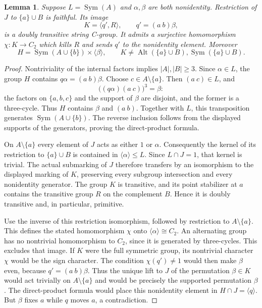 \documentclass[11pt,a4paper]{article}
\newtheorem{lemma}[theorem]{Lemma}
\newcommand{\gen}[1]{\langle#1\rangle}
\newcommand{\Sym}{\operatorname{Sym}}
\newcommand{\Alt}{\operatorname{Alt}}
\begin{document}
\begin{lemma}\label{faithful}
Suppose $L=\Sym(A)$ and $\alpha,\beta$ are both nonidentity.
Restriction of $J$ to $\{a\}\cup B$ is faithful. Its image
\[
 K=\gen{q',R},\qquad q'=(a\ b)\beta,
\]
is a doubly transitive string C-group. It admits a surjective
homomorphism $\chi:K\longrightarrow C_2$ which kills $R$ and
sends $q'$ to the nonidentity element. Moreover
\[
 H=\Sym(A\cup\{b\})\times\gen\beta,
 \qquad K\ne\Alt(\{a\}\cup B),\Sym(\{a\}\cup B).
\]
\end{lemma}
\begin{proof}
Nontriviality of the internal factors implies $|A|,|B|\ge3$.
Since $\alpha\in L$, the group $H$ contains
$q\alpha=(a\ b)\beta$. Choose $c\in A\setminus\{a\}$.
Then $(a\ c)\in L$, and
\[
 \bigl((q\alpha)(a\ c)\bigr)^3=\beta:
\]
the factors on $\{a,b,c\}$ and the support of $\beta$ are
disjoint, and the former is a three-cycle. Thus $H$ contains
$\beta$ and $(a\ b)$. Together with $L$, this transposition
generates $\Sym(A\cup\{b\})$. The reverse inclusion follows
from the displayed supports of the generators, proving the
direct-product formula.

On $A\setminus\{a\}$ every element of $J$ acts as either $1$
or $\alpha$. Consequently the kernel of its restriction to
$\{a\}\cup B$ is contained in $\gen\alpha\le L$.
Since $L\cap J=1$, that kernel is trivial. The actual submarking
of $J$ therefore transfers by an isomorphism to the displayed
marking of $K$, preserving every subgroup intersection and every
nonidentity generator. The group $K$ is transitive, and its
point stabilizer at $a$ contains the transitive group $R$ on
the complement $B$. Hence it is doubly transitive and, in
particular, primitive.

Use the inverse of this restriction isomorphism, followed by
restriction to $A\setminus\{a\}$. This defines the stated
homomorphism $\chi$ onto $\gen\alpha\cong C_2$.
An alternating group has no nontrivial homomorphism to $C_2$,
since it is generated by three-cycles. This excludes that image.
If $K$ were the full symmetric group, its nontrivial character
$\chi$ would be the sign character. The condition $\chi(q')\ne1$
would then make $\beta$ even, because $q'=(a\ b)\beta$.
Thus the unique lift to $J$ of the permutation $\beta\in K$
would act trivially on $A\setminus\{a\}$ and would be precisely
the supported permutation $\beta$. The direct-product formula
would place this nonidentity element in $H\cap J=\gen q$.
But $\beta$ fixes $a$ while $q$ moves $a$, a contradiction.
\end{proof}
\end{document}
